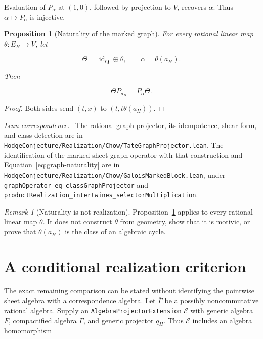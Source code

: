 \documentclass[11pt]{article}
\newtheorem{proposition}[theorem]{Proposition}
\theoremstyle{definition}
\theoremstyle{remark}
\newtheorem*{remark}{Remark}
\newcommand{\Q}{\mathbf Q}
\newcommand{\Gbar}{\overline{\Gamma}}
\newcommand{\leanpath}[1]{\texttt{\nolinkurl{#1}}}
\newcommand{\chowsrc}[1]{%
  \leanpath{HodgeConjecture/Realization/Chow/#1}}
\newenvironment{leanfiles}
  {\par\medskip\begingroup\footnotesize\raggedright\noindent
   \textit{Lean correspondence.}\ }
  {\par\endgroup\medskip}
\begin{document}
Evaluation of \(P_\alpha\) at \((1,0)\), followed by projection to \(V\),
recovers \(\alpha\).  Thus \(\alpha\mapsto P_\alpha\) is injective.

\begin{proposition}[Naturality of the marked graph]
\label{prop:marked-naturality}
For every rational linear map \(\theta:E_H\to V\), let

\[
  \Theta=\operatorname{id}_{\Q}\oplus\theta,
  \qquad
  \alpha=\theta(a_H).
\]

Then

\begin{equation}
\label{eq:graph-naturality}
  \Theta P_{a_H}=P_\alpha\Theta.
\end{equation}
\end{proposition}

\begin{proof}
Both sides send \((t,x)\) to \((t,t\theta(a_H))\).
\end{proof}

\begin{leanfiles}
The rational graph projector, its idempotence, shear form, and class
detection are in \chowsrc{TateGraphProjector.lean}.  The identification of
the marked-sheet graph operator with that construction and
Equation~\eqref{eq:graph-naturality} are in
\chowsrc{GaloisMarkedBlock.lean}, under
\leanpath{graphOperator_eq_classGraphProjector} and
\leanpath{productRealization_intertwines_selectorMultiplication}.
\end{leanfiles}

\begin{remark}[Naturality is not realization]
Proposition~\ref{prop:marked-naturality} applies to every rational linear map
\(\theta\).  It does not construct \(\theta\) from geometry, show that it is
motivic, or prove that \(\theta(a_H)\) is the class of an algebraic cycle.
\end{remark}

\section{A conditional realization criterion}
\label{sec:conditional-realization}

The exact remaining comparison can be stated without identifying the
pointwise sheet algebra with a correspondence algebra.  Let \(\Gbar\) be a
possibly noncommutative rational algebra.  Supply an
\leanpath{AlgebraProjectorExtension} \(\mathcal E\) with generic algebra
\(F\), compactified algebra \(\Gbar\), and generic projector \(q_H\).
Thus \(\mathcal E\) includes an algebra homomorphism
\end{document}
